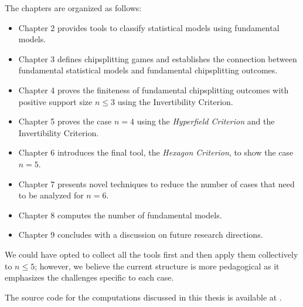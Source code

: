 The chapters are organized as follows:
\begin{itemize}
    \item Chapter 2 provides tools to classify statistical models using fundamental models.
    \item Chapter 3 defines chipsplitting games and establishes the connection between fundamental statistical models and fundamental chipsplitting outcomes.
    \item Chapter 4 proves the finiteness of fundamental chipsplitting outcomes with positive support size \( n \leq 3 \) using the Invertibility Criterion.
    \item Chapter 5 proves the case \( n = 4 \) using the \emph{Hyperfield Criterion} and the Invertibility Criterion.
    \item Chapter 6 introduces the final tool, the \emph{Hexagon Criterion}, to show the case \( n = 5 \).
    \item Chapter 7 presents novel techniques to reduce the number of cases that need to be analyzed for \( n = 6 \).
    \item Chapter 8 computes the number of fundamental models.
    \item Chapter 9 concludes with a discussion on future research directions.
\end{itemize}


We could have opted to collect all the tools first and then apply them collectively to \( n \leq 5 \); however, we believe the current structure is more pedagogical as it emphasizes the challenges specific to each case.

The source code for the computations discussed in this thesis is available at \cite{ducrepo}.